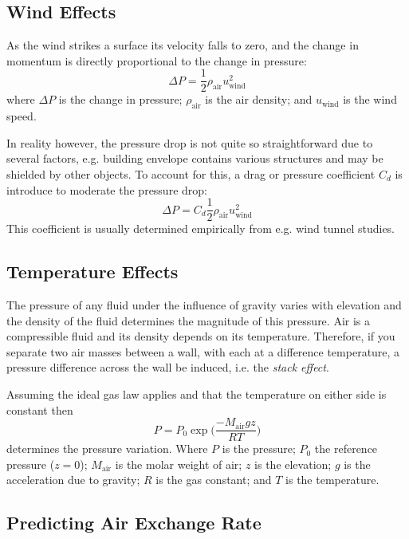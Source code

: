 \subsection{Wind Effects}

As the wind strikes a surface its velocity falls to zero, and the change in momentum is directly proportional to the change in pressure:
\begin{equation}\label{eq:wind_pressure_uncorrected}
  \Delta P = \frac{1}{2} \rho_\mathrm{air} u_\mathrm{wind}^2
\end{equation}
where $\Delta P$ is the change in pressure; $\rho_\mathrm{air}$ is the air density; and $u_\mathrm{wind}$ is the wind speed.\par

In reality however, the pressure drop is not quite so straightforward due to several factors, e.g. building envelope contains various structures and may be shielded by other objects.
To account for this, a drag or pressure coefficient $C_d$ is introduce to moderate the pressure drop:
\begin{equation}\label{eq:wind_pressure}
  \Delta P = C_d \frac{1}{2} \rho_\mathrm{air} u_\mathrm{wind}^2
\end{equation}
This coefficient is usually determined empirically from e.g. wind tunnel studies.

\subsection{Temperature Effects}

The pressure of any fluid under the influence of gravity varies with elevation and the density of the fluid determines the magnitude of this pressure.
Air is a compressible fluid and its density depends on its temperature.
Therefore, if you separate two air masses between a wall, with each at a difference temperature, a pressure difference across the wall be induced, i.e. the \textit{stack effect}.

Assuming the ideal gas law applies and that the temperature on either side is constant then
\begin{equation}
  P = P_0 \exp{\Big( \frac{-M_\mathrm{air}gz}{RT} \Big)}
\end{equation}
determines the pressure variation.
Where $P$ is the pressure; $P_0$ the reference pressure ($z=0$); $M_\mathrm{air}$ is the molar weight of air; $z$ is the elevation; $g$ is the acceleration due to gravity; $R$ is the gas constant; and $T$ is the temperature.\par

\subsection{Predicting Air Exchange Rate}


